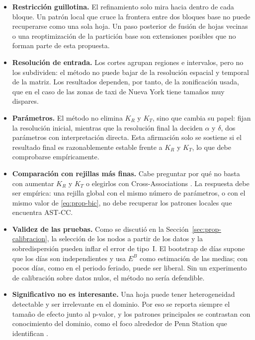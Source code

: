 \begin{itemize}
  \item \textbf{Restricción guillotina.} El refinamiento solo mira hacia
  dentro de cada bloque. Un patrón local que cruce la frontera entre dos
  bloques base no puede recuperarse como una sola hoja. Un paso posterior de
  fusión de hojas vecinas o una reoptimización de la partición base son
  extensiones posibles que no forman parte de esta propuesta.
  \item \textbf{Resolución de entrada.} Los cortes agrupan regiones e
  intervalos, pero no los subdividen: el método no puede bajar de la resolución
  espacial y temporal de la matriz. Los resultados dependen, por tanto, de la
  zonificación usada, que en el caso de las zonas de taxi de Nueva York tiene
  tamaños muy dispares.
  \item \textbf{Parámetros.} El método no elimina $K_R$ y $K_T$, sino que
  cambia su papel: fijan la resolución inicial, mientras que la resolución
  final la deciden $\alpha$ y $\delta$, dos parámetros con interpretación
  directa. Esta afirmación solo se sostiene si el resultado final es
  razonablemente estable frente a $K_R$ y $K_T$, lo que debe comprobarse
  empíricamente.
  \item \textbf{Comparación con rejillas más finas.} Cabe preguntar por qué
  no basta con aumentar $K_R$ y $K_T$ o elegirlos con Cross-Associations
  \cite{Chakrabarti2004}. La respuesta debe ser empírica: una rejilla global con
  el mismo número de parámetros, o con el mismo valor de \eqref{eq:prop-bic},
  no debe recuperar los patrones locales que encuentra AST-CC.
  \item \textbf{Validez de las pruebas.} Como se discutió en la
  Sección~\ref{sec:prop-calibracion}, la selección de los nodos a partir de
  los datos y la sobredispersión pueden inflar el error de tipo~I. El
  bootstrap de días supone que los días son independientes y usa $E^B$ como
  estimación de las medias; con pocos días, como en el periodo feriado, puede
  ser liberal. Sin un
  experimento de calibración sobre datos nulos, el método no sería defendible.
  \item \textbf{Significativo no es interesante.} Una hoja puede tener
  heterogeneidad detectable y ser irrelevante en el dominio. Por eso se reporta
  siempre el tamaño de efecto junto al p-valor, y los patrones principales se
  contrastan con conocimiento del dominio, como el foco alrededor de Penn
  Station que identifican \cite{Liu2021}.
\end{itemize}

